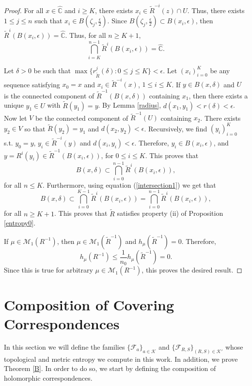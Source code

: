 \documentclass[11pt,letterpaper]{article}
\theoremstyle{definition}
\def\F{\mathcal{F}_a}
\begin{document}
\begin{proof}
For all $x\in\widehat{\mathbb{C}}$ and $i\geq K$, there exists $x_i\in \tilde{R}^{-i}(z)\cap U$. Thus, there exists $1\leq j\leq n$ such that $x_i\in B(\zeta_j,\frac{\epsilon}{2})$. Since $B(\zeta_j,\frac{\epsilon}{2})\subset B(x_i,\epsilon)$, then $\tilde{R}^i(B(x_i,\epsilon))=\widehat{\mathbb{C}}$. Thus, for all $n\geq K+1$,
\begin{equation}\label{intersection1}
\bigcap\limits_{i=K}^{n-1} \tilde{R}^i(B(x_i,\epsilon))=\widehat{\mathbb{C}}.\end{equation}

Let $\delta>0$ be such that $\max\lbrace r_{\tilde{R}}^j(\delta):0\leq j\leq K\rbrace<\epsilon$. Let $(x_i)_{i=0}^K$ be any sequence satisfying $x_0=x$ and $x_i\in \tilde{R}^{-i}(x)$, $1\leq i\leq K$. If $y\in B(x,\delta)$ and $U$ is the connected component of $\tilde{R}^{-1}(B(x,\delta))$ containing $x_1$, then there exists a unique $y_1\in U$ with $\tilde{R}(y_1)=y$. By Lemma \ref{radius}, $d(x_1,y_1)<r(\delta)<\epsilon$. Now let $V$ be the connected component of $\tilde{R}^{-1}(U)$ containing $x_2$. There exists $y_2\in V$ so that $\tilde{R}(y_2)=y_1$ and $d(x_2,y_2)<\epsilon$. Recursively, we find $(y_i)_{i=0}^K$ s.t. $y_0=y$, $y_i\in \tilde{R}^{-i}(y)$ and $d(x_i,y_i)<\epsilon$. Therefore, $y_i\in B(x_i,\epsilon)$, and $y=R^i(y_i)\in\tilde{R}^{-1}(B(x_i,\epsilon))$, for $0\leq i\leq K$. This proves that
$$B(x,\delta)\subset\bigcap\limits_{i=0}^{n-1}\tilde{R}^i(B(x_i,\epsilon)),$$
for all $n\leq K$. Furthermore, using equation (\ref{intersection1}) we get that
$$B(x,\delta)\subset\bigcap\limits_{i=0}^{K-1}\tilde{R}^i(B(x_i,\epsilon))=\bigcap\limits_{i=0}^{n-1}\tilde{R}^i(B(x_i,\epsilon)),$$
for all $n\geq K+1$. This proves that $\tilde{R}$ satisfies property (ii) of Proposition \ref{entropy0}. 

If $\mu\in\mathcal{M}_1(R^{-1})$, then $\mu\in\mathcal{M}_1(\tilde{R}^{-1})$ and $h_{\mu}(\tilde{R}^{-1})=0$. Therefore,
$$h_{\mu}(R^{-1})\leq\frac{1}{n_0}h_{\mu}(\tilde{R}^{-1})=0.$$
Since this is true for arbitrary $\mu\in\mathcal{M}_1(R^{-1})$, this proves the desired result.
\end{proof}

\section{Composition of Covering Correspondences}\label{com}
In this section we will define the families $\lbrace\F\rbrace_{a\in\mathcal{K}}$ and $\lbrace\mathcal{F}_{R,S}\rbrace_{(R,S)\in\mathcal{K}'}$ whose topological and metric entropy we compute in this work. In addition, we prove Theorem \ref{B}. In order to do so, we start by defining the composition of holomorphic correspondences.
\end{document}
